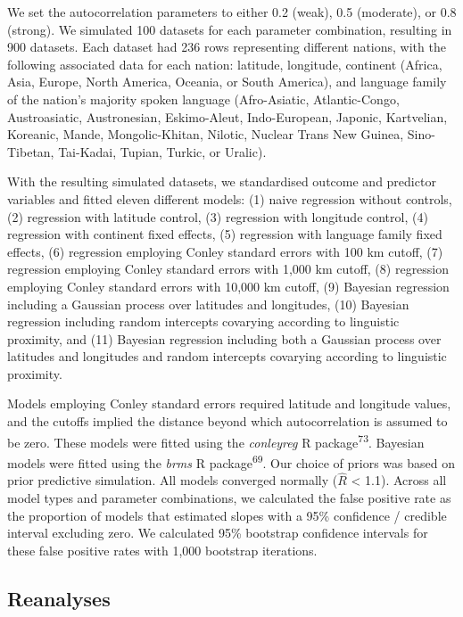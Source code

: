 \documentclass[english,man,floatsintext]{apa6}
\begin{document}
We set the autocorrelation parameters to either 0.2 (weak), 0.5 (moderate), or 0.8 (strong). We simulated 100 datasets for each parameter combination, resulting in 900 datasets. Each dataset had 236 rows representing different nations, with the following associated data for each nation: latitude, longitude, continent (Africa, Asia, Europe, North America, Oceania, or South America), and language family of the nation's majority spoken language (Afro-Asiatic, Atlantic-Congo, Austroasiatic, Austronesian, Eskimo-Aleut, Indo-European, Japonic, Kartvelian, Koreanic, Mande, Mongolic-Khitan, Nilotic, Nuclear Trans New Guinea, Sino-Tibetan, Tai-Kadai, Tupian, Turkic, or Uralic).

With the resulting simulated datasets, we standardised outcome and predictor variables and fitted eleven different models: (1) naive regression without controls, (2) regression with latitude control, (3) regression with longitude control, (4) regression with continent fixed effects, (5) regression with language family fixed effects, (6) regression employing Conley standard errors with 100 km cutoff, (7) regression employing Conley standard errors with 1,000 km cutoff, (8) regression employing Conley standard errors with 10,000 km cutoff, (9) Bayesian regression including a Gaussian process over latitudes and longitudes, (10) Bayesian regression including random intercepts covarying according to linguistic proximity, and (11) Bayesian regression including both a Gaussian process over latitudes and longitudes and random intercepts covarying according to linguistic proximity.

Models employing Conley standard errors required latitude and longitude values, and the cutoffs implied the distance beyond which autocorrelation is assumed to be zero. These models were fitted using the \emph{conleyreg} R package\textsuperscript{73}. Bayesian models were fitted using the \emph{brms} R package\textsuperscript{69}. Our choice of priors was based on prior predictive simulation. All models converged normally (\(\hat{R}\) \textless{} 1.1). Across all model types and parameter combinations, we calculated the false positive rate as the proportion of models that estimated slopes with a 95\% confidence / credible interval excluding zero. We calculated 95\% bootstrap confidence intervals for these false positive rates with 1,000 bootstrap iterations.

\hypertarget{reanalyses}{%
\subsection{Reanalyses}\label{reanalyses}}
\end{document}
